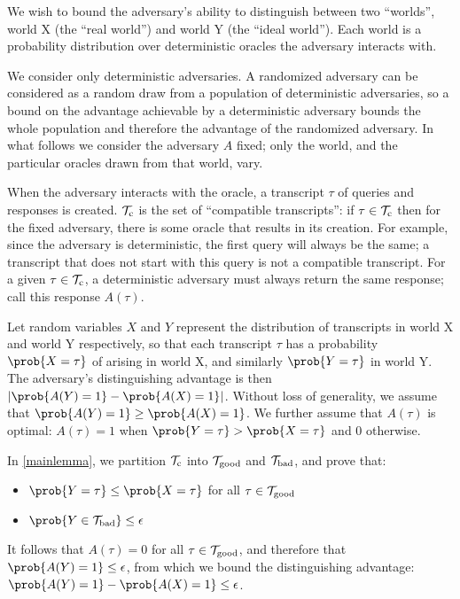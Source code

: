 \documentclass[hctr2.tex]{subfiles}
\begin{document}
We wish to bound the adversary's ability to distinguish between
two ``worlds'', world X (the ``real world'') and world Y (the ``ideal world'').
Each world is a probability distribution over
deterministic oracles the adversary interacts with.

We consider only deterministic adversaries.
A randomized adversary can be considered as a random draw
from a population of deterministic adversaries, so
a bound on the advantage achievable by a deterministic
adversary bounds the whole population and therefore
the advantage of the randomized adversary. In what follows
we consider the adversary \(A\) fixed; only the world, and the
particular oracles drawn from that world, vary.

When the adversary interacts with the oracle,
a transcript \(\tau\) of queries and responses is created.
\(\mathcal{T}_\mathrm{c}\) is the set of ``compatible transcripts'':
if \(\tau \in \mathcal{T}_\mathrm{c}\) then for the fixed adversary,
there is some oracle
that results in its creation. For example,
since the adversary is deterministic, the first query
will always be the same; a transcript that
does not start with this query is not a compatible transcript.
For a given \(\tau \in \mathcal{T}_\mathrm{c}\),
a deterministic adversary must always
return the same response; call this response \(A(\tau)\).

Let random variables \(X\) and \(Y\)
represent the distribution of transcripts
in world X and world Y respectively, so that
each transcript \(\tau\) has a probability \(\prob{X = \tau}\)
of arising in world X, and similarly \(\prob{Y = \tau}\) in world Y.
The adversary's distinguishing advantage is then
\(\left|\prob{A(Y) = 1} - \prob{A(X) = 1}\right|\).
Without loss of generality,
we assume that \(\prob{A(Y) = 1} \geq \prob{A(X) = 1}\).
We further assume that \(A(\tau)\) is optimal:
\(A(\tau) = 1\)
when \(\prob{Y = \tau} > \prob{X = \tau}\) and 0 otherwise.

In \autoref{mainlemma}, we partition \(\mathcal{T}_\mathrm{c}\) into \(\mathcal{T}_\mathrm{good}\) and \(\mathcal{T}_\mathrm{bad}\),
and prove that:
\begin{itemize}
    \item \(\prob{Y = \tau} \leq \prob{X = \tau}\) for all \(\tau \in \mathcal{T}_\mathrm{good}\)
    \item \(\prob{Y \in \Tb} \leq \epsilon\)
\end{itemize}
It follows that \(A(\tau) = 0\) for all \(\tau \in \mathcal{T}_\mathrm{good}\),
and therefore that \(\prob{A(Y) = 1} \leq \epsilon\),
from which we bound the distinguishing advantage:
\(\prob{A(Y) = 1} - \prob{A(X) = 1} \leq \epsilon\).
\end{document}
